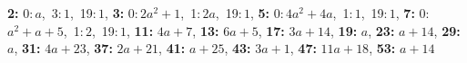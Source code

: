 \textsf{\bfseries 2:} 0:\,$a$,\ 3:\,$1$,\ 19:\,$1$, \textsf{\bfseries 3:} 0:\,$2a^2 + 1$,\ 1:\,$2a$,\ 19:\,$1$, \textsf{\bfseries 5:} 0:\,$4a^2 + 4a$,\ 1:\,$1$,\ 19:\,$1$, \textsf{\bfseries 7:} 0:\,$a^2 + a + 5$,\ 1:\,$2$,\ 19:\,$1$, \textsf{\bfseries 11:} $4a + 7$, \textsf{\bfseries 13:} $6a + 5$, \textsf{\bfseries 17:} $3a + 14$, \textsf{\bfseries 19:} $a$, \textsf{\bfseries 23:} $a + 14$, \textsf{\bfseries 29:} $a$, \textsf{\bfseries 31:} $4a + 23$, \textsf{\bfseries 37:} $2a + 21$, \textsf{\bfseries 41:} $a + 25$, \textsf{\bfseries 43:} $3a + 1$, \textsf{\bfseries 47:} $11a + 18$, \textsf{\bfseries 53:} $a + 14$